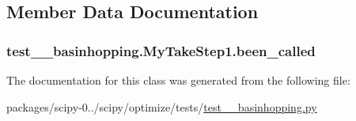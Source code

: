 \subsection{Member Data Documentation}
\hypertarget{classtest____basinhopping_1_1MyTakeStep1_acdb08578258362ed06392dfe95e4eecb}{}
\subsubsection[{been\+\_\+called}]{\setlength{\rightskip}{0pt plus 5cm}test\+\_\+\+\_\+basinhopping.\+My\+Take\+Step1.\+been\+\_\+called}\label{classtest____basinhopping_1_1MyTakeStep1_acdb08578258362ed06392dfe95e4eecb}


The documentation for this class was generated from the following file\+:\begin{DoxyCompactItemize}
\item 
packages/scipy-\/0../scipy/optimize/tests/\hyperlink{test____basinhopping_8py}{test\+\_\+\+\_\+basinhopping.\+py}\end{DoxyCompactItemize}
